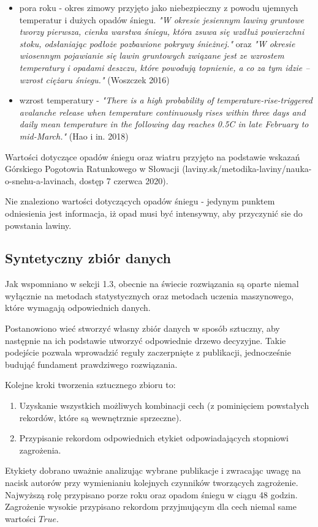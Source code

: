 \begin{itemize}
	\item pora roku - okres zimowy przyjęto jako niebezpieczny z powodu ujemnych temperatur i dużych opadów śniegu. \textit{"W okresie jesiennym lawiny gruntowe tworzy pierwsza, cienka warstwa śniegu, która zsuwa się wzdłuż powierzchni stoku, odsłaniając podłoże pozbawione pokrywy śnieżnej."} oraz \textit{"W okresie wiosennym pojawianie się lawin gruntowych związane jest ze wzrostem temperatury i opadami deszczu, które powodują topnienie, a co za tym idzie – wzrost ciężaru śniegu."} (Woszczek 2016)
	\item wzrost temperatury - \textit{"There is a high probability of temperature-rise-triggered avalanche release when temperature continuously rises within three days and daily mean temperature in the following day reaches 0.5\degree C in late February to mid-March."} (Hao i in. 2018)
\end{itemize}
	Wartości dotyczące opadów śniegu oraz wiatru przyjęto na podstawie wskazań Górskiego Pogotowia Ratunkowego w Słowacji (laviny.sk/metodika-laviny/nauka-o-snehu-a-lavinach, dostęp 7 czerwca 2020).
	
	Nie znaleziono wartości dotyczących opadów śniegu - jedynym punktem odniesienia jest informacja, iż opad musi być intensywny, aby przyczynić sie do powstania lawiny. 

\subsection{Syntetyczny zbiór danych}
Jak wspomniano w sekcji 1.3, obecnie na świecie rozwiązania są oparte niemal wyłącznie na metodach statystycznych oraz metodach uczenia maszynowego, które wymagają odpowiednich danych.

Postanowiono wieć stworzyć własny zbiór danych w sposób sztuczny, aby następnie na ich podstawie utworzyć odpowiednie drzewo decyzyjne. Takie podejście pozwala wprowadzić reguły zaczerpnięte z publikacji, jednocześnie budująć fundament prawdziwego rozwiązania. 

Kolejne kroki tworzenia sztucznego zbioru to:
\begin{enumerate}
	\item Uzyskanie wszystkich możliwych kombinacji cech (z pominięciem powstałych rekordów, które są wewnętrznie sprzeczne).
	\item Przypisanie rekordom odpowiednich etykiet odpowiadających stopniowi zagrożenia. 
\end{enumerate}

Etykiety dobrano uważnie analizując wybrane publikacje i zwracając uwagę na nacisk autorów przy wymienianiu kolejnych czynników tworzących zagrożenie. Najwyższą rolę przypisano porze roku oraz opadom śniegu w ciągu 48 godzin. Zagrożenie wysokie przypisano rekordom przyjmującym dla cech niemal same wartości $True$.

